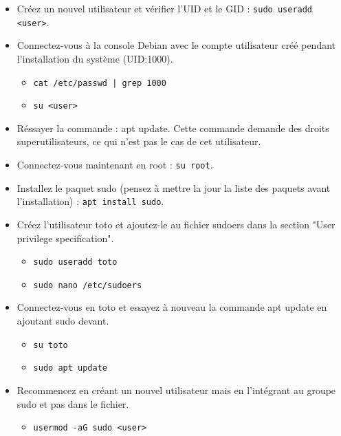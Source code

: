 \documentclass[a4paper]{article}
\begin{document}
\begin{itemize}
\item Créez un nouvel utilisateur et vérifier l’UID et le GID : \texttt{sudo useradd <user>}.

\item Connectez-vous à la console Debian avec le compte utilisateur créé pendant l’installation du système (UID:1000).
\begin{example}
    \begin{itemize}
        \item \texttt{cat /etc/passwd | grep 1000}
        \item \texttt{su <user>}
    \end{itemize}
\end{example}

\item Réssayer la commande : apt update. Cette commande demande des droits superutilisateurs, ce qui n’est pas le cas de cet utilisateur.

\item Connectez-vous maintenant en root : \texttt{su root}.

\item Installez le paquet sudo (pensez à mettre la jour la liste des paquets avant l’installation) : \texttt{apt install sudo}.

\item Créez l’utilisateur toto et ajoutez-le au fichier sudoers dans la section "User privilege specification".
\begin{example}
    \begin{itemize}
        \item \texttt{sudo useradd toto}
        \item \texttt{sudo nano /etc/sudoers}
    \end{itemize}
\end{example}

\item Connectez-vous en toto et essayez à nouveau la commande apt update en ajoutant sudo devant.
\begin{example}
    \begin{itemize}
        \item \texttt{su toto}
        \item \texttt{sudo apt update}
    \end{itemize}
\end{example}

\item Recommencez en créant un nouvel utilisateur mais en l’intégrant au groupe sudo et pas dans le fichier.
\begin{example}
    \begin{itemize}
        \item \texttt{usermod -aG sudo <user>}
    \end{itemize}
\end{example}

\end{itemize}
\end{document}
